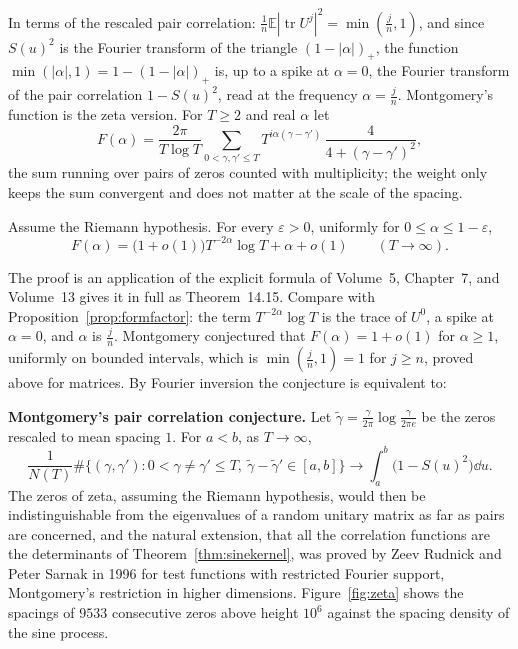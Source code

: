 In terms of the rescaled pair correlation: $\frac1n\mathbb E|\operatorname{tr}U^j|^2=\min(\frac jn,1)$, and since $S(u)^2$ is the Fourier transform of the triangle $(1-|\alpha|)_+$, the function $\min(|\alpha|,1)=1-(1-|\alpha|)_+$ is, up to a spike at $\alpha=0$, the Fourier transform of the pair correlation $1-S(u)^2$, read at the frequency $\alpha=\frac jn$. Montgomery's
function is the zeta version. For $T\ge2$ and real $\alpha$ let
\[
F(\alpha)=\frac{2\pi}{T\log T}\sum_{0<\gamma,\gamma'\le T}T^{i\alpha(\gamma-\gamma')}\,\frac4{4+(\gamma-\gamma')^2},
\]
the sum running over pairs of zeros counted with multiplicity; the weight only keeps the sum convergent and does not matter at the scale of the spacing.

\begin{theorem}\label{thm:montgomery}
Assume the Riemann hypothesis. For every $\varepsilon>0$, uniformly for $0\le\alpha\le1-\varepsilon$,
\[
F(\alpha)=\bigl(1+o(1)\bigr)T^{-2\alpha}\log T+\alpha+o(1)\qquad(T\to\infty).
\]
\end{theorem}

The proof is an application of the explicit formula of Volume~5, Chapter~7, and Volume~13 gives it in full as Theorem~14.15. Compare with Proposition~\ref{prop:formfactor}: the term $T^{-2\alpha}\log T$ is the trace of $U^0$, a spike at $\alpha=0$, and $\alpha$ is
$\frac jn$. Montgomery conjectured that $F(\alpha)=1+o(1)$ for $\alpha\ge1$, uniformly on bounded intervals, which is $\min(\frac jn,1)=1$ for $j\ge n$, proved above for matrices. By Fourier inversion the conjecture is equivalent to:

\begin{beauty}
\textbf{Montgomery's pair correlation conjecture.} Let $\tilde\gamma=\frac\gamma{2\pi}\log\frac\gamma{2\pi e}$ be the zeros rescaled to mean spacing $1$. For $a<b$, as $T\to\infty$,
\[
\frac1{N(T)}\#\bigl\{(\gamma,\gamma'):0<\gamma\ne\gamma'\le T,\ \tilde\gamma-\tilde\gamma'\in[a,b]\bigr\}\longrightarrow\int_a^b\bigl(1-S(u)^2\bigr)\dd u.
\]
The zeros of zeta, assuming the Riemann hypothesis, would then be indistinguishable from the eigenvalues of a random unitary matrix as far as pairs are concerned, and the natural extension, that all the correlation functions
are the determinants of Theorem~\ref{thm:sinekernel}, was proved by Zeev Rudnick and Peter Sarnak in 1996 for test functions with restricted Fourier support, Montgomery's restriction in higher dimensions. Figure~\ref{fig:zeta}
shows the spacings of $9533$ consecutive zeros above height $10^6$ against the spacing density of the sine process.
\end{beauty}

